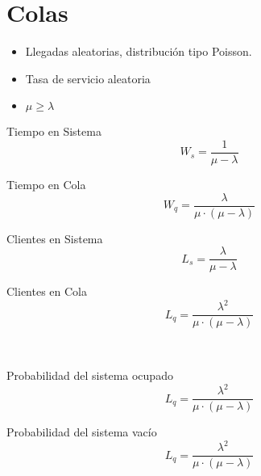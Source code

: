 \documentclass[10pt,letterpaper]{article}
\begin{document}
\section{Colas}
\begin{itemize}
\item Llegadas aleatorias, distribución tipo Poisson.
\item Tasa de servicio aleatoria
\item $\mu \geq \lambda$
\end{itemize}
\begin{enumerate}

\begin{minipage}[t]{.25\textwidth}
\raggedright
\item Tiempo en Sistema
$$
W_s = \dfrac{1}{\mu - \lambda}
$$
\end{minipage}%
\begin{minipage}[t]{.25\textwidth}
\raggedright
\item Tiempo en Cola
$$
W_q = \dfrac{\lambda}{\mu\cdot (\mu - \lambda)}
$$
\end{minipage}%
\begin{minipage}[t]{.25\textwidth}
\raggedright
\item Clientes en Sistema
$$
L_s = \dfrac{\lambda}{\mu - \lambda}
$$
\end{minipage}%
\begin{minipage}[t]{.25\textwidth}
\raggedright
\item Clientes en Cola
$$
L_q = \dfrac{\lambda^2}{\mu\cdot (\mu - \lambda)}
$$
\end{minipage}
\\${ }$\\ 
\begin{minipage}[t]{.5\textwidth}
\raggedright
\item Probabilidad del sistema ocupado
$$
L_q = \dfrac{\lambda^2}{\mu\cdot (\mu - \lambda)}
$$
\end{minipage}%
\begin{minipage}[t]{.5\textwidth}
\raggedright
\item Probabilidad del sistema vacío
$$
L_q = \dfrac{\lambda^2}{\mu\cdot (\mu - \lambda)}
$$
\end{minipage}
\end{enumerate}
\end{document}
